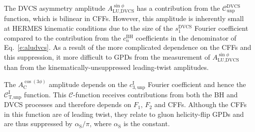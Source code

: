 The DVCS asymmetry amplitude $A^{\sin\phi}_{\textrm{LU,DVCS}}$ has a
contribution from the $\mathcal{C}_{\textrm{unp}}^{\textrm{DVCS}}$ function,
which is bilinear in CFFs. However, this  amplitude is inherently small at HERMES kinematic conditions due to the size of the $s_{1}^{\textrm{DVCS}}$ Fourier coefficient compared to the contribution from the $c_{n}^{\textrm{BH}}$ coefficients in the denominator of Eq.~\ref{e:aludvcs}. As a result of
the more complicated dependence on the CFFs and this suppression, it
 more difficult to  GPDs
from the measurement of $A^{\sin\phi}_{\textrm{LU,DVCS}}$ than from the
kinematically-unsuppressed leading-twist amplitudes.

The $A^{\cos(3\phi)}_{\textrm{C}}$ amplitude depends on the
$c_{3,\textrm{unp}}^{\textrm{I}}$ Fourier coefficient and hence the
$\mathcal{C}_{\textrm{T,unp}}^{\textrm{I}}$ function. This
$\mathcal{C}$-function receives contributions from both the BH and DVCS
processes and therefore depends on $F_{1}$, $F_{2}$ and CFFs. Although the CFFs
in this function are of leading twist, they relate to gluon helicity-flip GPDs and are thus suppressed by $\alpha_{\textrm{S}}/\pi$,
where $\alpha_{\textrm{S}}$ is the constant.
